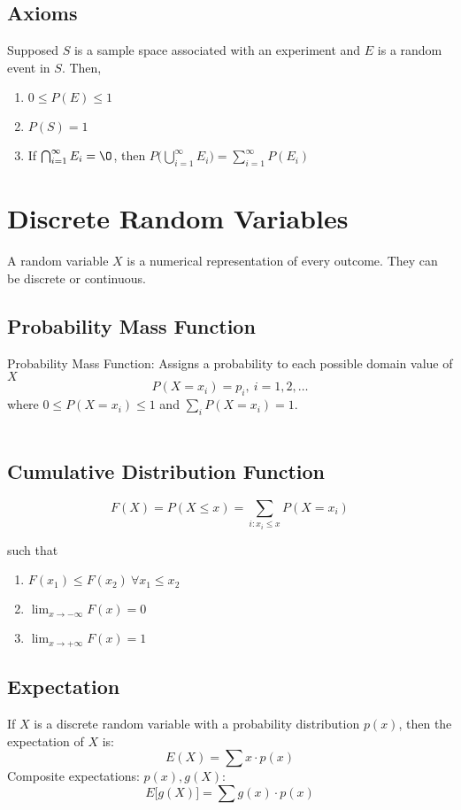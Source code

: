 \documentclass[13pt]{article}
\begin{document}
\subsection{Axioms}
Supposed $S$ is a sample space associated with an experiment and $E$
is a random event in $S$. Then,
\begin{enumerate}[label=(\roman*)]
\item $0 \leq P(E) \leq 1$
\item $P(S) = 1$
\item If $\bigcap_{i = 1}^{\infty} E_{i} = \O$, then $P\big(\bigcup_{i =
    1}^{\infty} E_{i}\big) = \sum_{i = 1}^{\infty} P(E_{i})$
\end{enumerate}





\section{Discrete Random Variables}
A random variable $X$ is a numerical representation of every
outcome. They can be discrete or continuous.

\subsection{Probability Mass Function}
Probability Mass Function: Assigns a probability to each possible
domain value of $X$
\[P(X = x_{i}) = p_{i}, \ i = 1, 2, \ldots\]
where $0 \leq P(X = x_{i}) \leq 1$ and $\sum_{i} P(X = x_{i}) = 1$. \\ \\

\subsection{Cumulative Distribution Function}
\[F(X) = P(X \leq x) = \sum_{i : x_{i} \leq x} P(X = x_{i})\]

such that
\begin{enumerate}[label=(\roman*)]
\item $F(x_{1}) \leq F(x_{2}) \ \forall x_{1} \leq x_{2}$
\item $\lim_{x \rightarrow -\infty} F(x) = 0$
\item $\lim_{x \rightarrow +\infty} F(x) = 1$
\end{enumerate}

\subsection{Expectation}
If $X$ is a discrete random variable with a probability distribution
$p(x)$, then the expectation of $X$ is:
\[E(X) = \sum  x \cdot p(x)\]
Composite expectations: $p(x), g(X)$:
\[E\big[g(X)\big] = \sum g(x) \cdot p(x)\]
\end{document}
